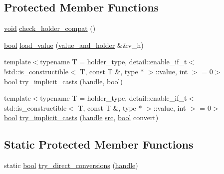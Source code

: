 \subsection*{Protected Member Functions}
\begin{DoxyCompactItemize}
\item 
\mbox{\hyperlink{_s_d_l__opengles2__gl2ext_8h_ae5d8fa23ad07c48bb609509eae494c95}{void}} \mbox{\hyperlink{structcopyable__holder__caster_aeaf5f5d682581b26ea69b8ceb0e62951}{check\+\_\+holder\+\_\+compat}} ()
\item 
\mbox{\hyperlink{asdl_8h_af6a258d8f3ee5206d682d799316314b1}{bool}} \mbox{\hyperlink{structcopyable__holder__caster_a4a9cd62ddae9d35595b889dcf1cde32b}{load\+\_\+value}} (\mbox{\hyperlink{structvalue__and__holder}{value\+\_\+and\+\_\+holder}} \&\&v\+\_\+h)
\item 
{\footnotesize template$<$typename T  = holder\+\_\+type, detail\+::enable\+\_\+if\+\_\+t$<$!std\+::is\+\_\+constructible$<$ T, const T \&, type $\ast$ $>$\+::value, int $>$  = 0$>$ }\\\mbox{\hyperlink{asdl_8h_af6a258d8f3ee5206d682d799316314b1}{bool}} \mbox{\hyperlink{structcopyable__holder__caster_a3bcddc9789c2710905270b7888b36a46}{try\+\_\+implicit\+\_\+casts}} (\mbox{\hyperlink{classhandle}{handle}}, \mbox{\hyperlink{asdl_8h_af6a258d8f3ee5206d682d799316314b1}{bool}})
\item 
{\footnotesize template$<$typename T  = holder\+\_\+type, detail\+::enable\+\_\+if\+\_\+t$<$ std\+::is\+\_\+constructible$<$ T, const T \&, type $\ast$ $>$\+::value, int $>$  = 0$>$ }\\\mbox{\hyperlink{asdl_8h_af6a258d8f3ee5206d682d799316314b1}{bool}} \mbox{\hyperlink{structcopyable__holder__caster_a9dbbb61be9263940f6bda512f25e5443}{try\+\_\+implicit\+\_\+casts}} (\mbox{\hyperlink{classhandle}{handle}} \mbox{\hyperlink{_s_d_l__opengl__glext_8h_a72e0fdf0f845ded60b1fada9e9195cd7}{src}}, \mbox{\hyperlink{asdl_8h_af6a258d8f3ee5206d682d799316314b1}{bool}} convert)
\end{DoxyCompactItemize}
\subsection*{Static Protected Member Functions}
\begin{DoxyCompactItemize}
\item 
static \mbox{\hyperlink{asdl_8h_af6a258d8f3ee5206d682d799316314b1}{bool}} \mbox{\hyperlink{structcopyable__holder__caster_af1b6fc22fdfe27e062af0ee7f74ccd54}{try\+\_\+direct\+\_\+conversions}} (\mbox{\hyperlink{classhandle}{handle}})
\end{DoxyCompactItemize}
